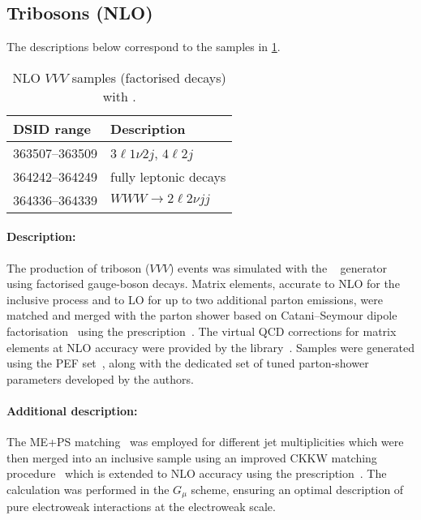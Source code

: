 \subsection{Tribosons (NLO)}

The descriptions below correspond to the samples in
\cref{tab:MB-sherpa-vvvnlo}.

\begin{table}[htbp]
  \caption{NLO $VVV$ samples (factorised decays) with \SHERPA.}%
  \label{tab:MB-sherpa-vvvnlo}
  \centering
  \begin{tabular}{l l}
    \toprule
    DSID range & Description \\
    \midrule
    363507--363509   & $3\ell1\nu2j$, $4\ell2j$\\
    364242--364249   & fully leptonic decays\\
    364336--364339   & $WWW\to 2\ell2\nu jj$\\
    \bottomrule
  \end{tabular}
\end{table}

\paragraph{Description:}

The production of triboson ($VVV$) events was simulated with the 
\SHERPA[2.2.2]~\cite{Bothmann:2019yzt} generator using factorised gauge-boson decays. 
Matrix elements, accurate to NLO for the inclusive process and to LO for up to 
two additional parton emissions, were matched and merged with the \SHERPA parton 
shower based on Catani--Seymour dipole factorisation~\cite{Gleisberg:2008fv,Schumann:2007mg} 
using the \MEPSatNLO prescription~\cite{Hoeche:2011fd,Hoeche:2012yf,Catani:2001cc,Hoeche:2009rj}. 
The virtual QCD corrections for matrix elements at NLO accuracy were 
provided by the \OPENLOOPS library~\cite{Buccioni:2019sur,Cascioli:2011va,Denner:2016kdg}.
Samples were generated using the \NNPDF[3.0nnlo] PEF set~\cite{Ball:2014uwa}, along with
the dedicated set of tuned parton-shower parameters developed by the \SHERPA authors.


\paragraph{Additional description:}

The ME+PS matching~\cite{Hoeche:2011fd} was employed for different jet
multiplicities which were then merged into an inclusive sample 
using an improved CKKW matching procedure~\cite{Catani:2001cc,Hoeche:2009rj} which is extended to NLO
accuracy using the \MEPSatNLO prescription~\cite{Hoeche:2012yf}.  The
calculation was performed in the $G_\mu$ scheme, ensuring an optimal description of pure electroweak interactions at the
electroweak scale.

